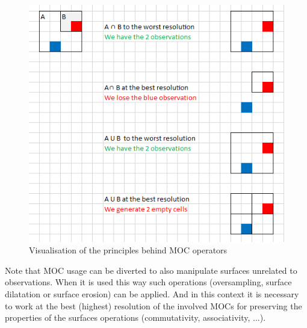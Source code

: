 \documentclass[11pt,a4paper]{ivoa}
\begin{document}
\begin{figure}[!htbp]
\begin{center}
\includegraphics[scale=.5]{operation.png}
\end{center}
\caption[Visualisation of MOC operations]{Visualisation of the
  principles behind MOC operators}
\label{fig:operation}
\end{figure}

Note that MOC usage can be diverted to also manipulate surfaces unrelated
to observations. When it is used this way such operations (oversampling,
surface dilatation or surface erosion) can be applied. 
And in this context it is necessary to work at the best (highest)
resolution of the involved MOCs for preserving the properties of the
surfaces operations (commutativity, associativity, ...).
\end{document}

